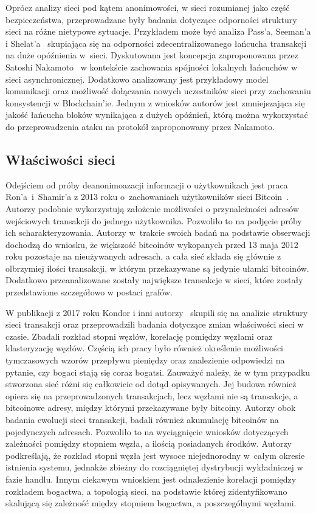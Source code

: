 \documentclass[12pt, oneside, final, openany]{mgr}
\begin{document}
\indent Oprócz analizy sieci pod kątem anonimowości, w sieci rozumianej jako część bezpieczeństwa, przeprowadzane były badania dotyczące odporności struktury sieci na różne nietypowe sytuacje. Przykładem może być analiza Pass'a, Seeman'a i Shelat'a~\cite{Pass2017} skupiająca się na odporności zdecentralizowanego łańcucha transakcji na duże opóźnienia w~sieci. Dyskutowana jest koncepcja zaproponowana przez Satoshi Nakamoto~\cite{nakamoto2008bitcoin} w kontekście zachowania spójności lokalnych łańcuchów w sieci asynchronicznej. Dodatkowo analizowany jest przykładowy model komunikacji oraz możliwość dołączania nowych uczestników sieci przy zachowaniu konsystencji w Blockchain'ie. Jednym z wniosków autorów jest zmniejszająca się jakość łańcucha bloków wynikająca z dużych opóźnień, którą można wykorzystać do przeprowadzenia ataku na protokół zaproponowany przez Nakamoto.

\if@archive\else{\newpage}\fi
\subsection{Właściwości sieci}

\indent Odejściem od próby deanonimoazacji informacji o użytkownikach jest praca Ron'a~i~Shamir'a z 2013 roku o~zachowaniach użytkowników sieci Bitcoin~\cite{Ron2013}. Autorzy podobnie wykorzystują założenie możliwości o przynależności adresów wejściowych transakcji do jednego użytkownika. Pozwoliło to na podjęcie próby ich scharakteryzowania. Autorzy w~trakcie swoich badań na podstawie obserwacji dochodzą do wniosku, że większość bitcoinów wykopanych przed 13 maja 2012 roku pozostaje na nieużywanych adresach, a cała sieć składa się głównie z olbrzymiej ilości transakcji, w którym przekazywane są jedynie ułamki bitcoinów. Dodatkowo przeanalizowane zostały największe transakcje w sieci, które zostały przedstawione szczegółowo w postaci grafów. 

\indent W publikacji z 2017 roku Kondor i inni autorzy~\cite{Kondor2014} skupili się na analizie struktury sieci transakcji oraz przeprowadzili badania dotyczące zmian właściwości sieci w czasie. Zbadali rozkład stopni węzłów, korelację pomiędzy węzłami oraz klasteryzację węzłów. Częścią ich pracy było również określenie możliwości tymczasowych wzorów przepływu pieniędzy oraz znalezienie odpowiedzi na pytanie, czy bogaci stają się coraz bogatsi. Zauważyć należy, że w tym przypadku stworzona sieć różni się całkowicie od dotąd opisywanych. Jej budowa również opiera się na przeprowadzonych transakcjach, lecz węzłami nie są transakcje, a bitcoinowe adresy, między którymi przekazywane były bitcoiny. Autorzy obok badania ewolucji sieci transakcji, badali również akumulację bitcoinów na pojedynczych adresach. Pozwoliło to na wyciągnięcie wniosków dotyczących zależności pomiędzy stopniem węzła, a ilością posiadanych środków. Autorzy podkreślają, że rozkład stopni węzła jest wysoce niejednorodny w~całym okresie istnienia systemu, jednakże zbieżny do rozciągniętej dystrybucji wykładniczej w fazie handlu. Innym ciekawym wnioskiem jest odnalezienie korelacji pomiędzy rozkładem bogactwa, a topologią sieci, na podstawie której zidentyfikowano skalującą się zależność między stopniem bogactwa, a poszczególnymi węzłami.
\end{document}
